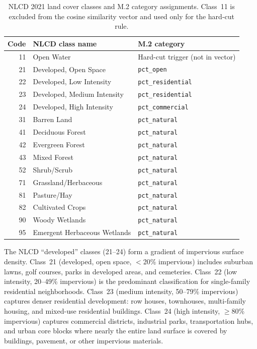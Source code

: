 \begin{table}[ht]
\centering
\caption{NLCD 2021 land cover classes and M.2 category assignments.
  Class~11 is excluded from the cosine similarity vector and used only
  for the hard-cut rule.}
\label{tab:nlcd-classes}
\small
\begin{tabular}{rll}
\toprule
Code & NLCD class name & M.2 category \\
\midrule
11   & Open Water & Hard-cut trigger (not in vector) \\
21   & Developed, Open Space & \texttt{pct\_open} \\
22   & Developed, Low Intensity & \texttt{pct\_residential} \\
23   & Developed, Medium Intensity & \texttt{pct\_residential} \\
24   & Developed, High Intensity & \texttt{pct\_commercial} \\
31   & Barren Land & \texttt{pct\_natural} \\
41   & Deciduous Forest & \texttt{pct\_natural} \\
42   & Evergreen Forest & \texttt{pct\_natural} \\
43   & Mixed Forest & \texttt{pct\_natural} \\
52   & Shrub/Scrub & \texttt{pct\_natural} \\
71   & Grassland/Herbaceous & \texttt{pct\_natural} \\
81   & Pasture/Hay & \texttt{pct\_natural} \\
82   & Cultivated Crops & \texttt{pct\_natural} \\
90   & Woody Wetlands & \texttt{pct\_natural} \\
95   & Emergent Herbaceous Wetlands & \texttt{pct\_natural} \\
\bottomrule
\end{tabular}
\end{table}

The NLCD ``developed'' classes (21--24) form a gradient of impervious surface
density.
Class~21 (developed, open space, $<$20\% impervious) includes suburban lawns,
golf courses, parks in developed areas, and cemeteries.
Class~22 (low intensity, 20--49\% impervious) is the predominant classification
for single-family residential neighborhoods.
Class~23 (medium intensity, 50--79\% impervious) captures denser residential
development: row houses, townhouses, multi-family housing, and mixed-use
residential buildings.
Class~24 (high intensity, $\geq$80\% impervious) captures commercial districts,
industrial parks, transportation hubs, and urban core blocks where nearly
the entire land surface is covered by buildings, pavement, or other
impervious materials.

